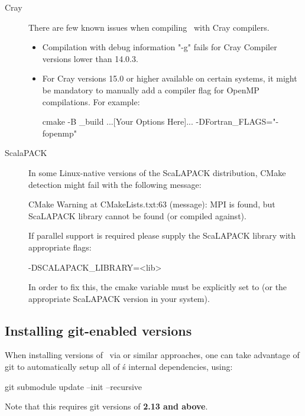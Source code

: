 \begin{description}
  \item[Cray]%
  There are few known issues when compiling \siesta\ with Cray compilers.

  \begin{itemize}
    \item Compilation with debug information "-g" fails for Cray Compiler
          versions lower than 14.0.3.

    \item For Cray versions 15.0 or higher available on certain systems,
    it might be mandatory to manually add a compiler flag for OpenMP
    compilations. For example:

      \begin{shellexample}
        cmake -B _build ...[Your Options Here]... -DFortran_FLAGS="-fopenmp"
      \end{shellexample}
  \end{itemize}

  \item[ScalaPACK]
  In some Linux-native versions of the ScaLAPACK distribution, CMake detection
  might fail with the following message:

  \begin{shellexample}[xleftmargin=1ex,fontsize=\footnotesize]
    CMake Warning at CMakeLists.txt:63 (message):
    MPI is found, but ScaLAPACK library cannot be found (or compiled against).

    If parallel support is required please supply the ScaLAPACK library with
    appropriate flags:

    -DSCALAPACK_LIBRARY=<lib>
  \end{shellexample}

  In order to fix this, the cmake variable  must be
  explicitly set to  (or the
  appropriate ScaLAPACK version in your system).
\end{description}


\subsection{Installing git-enabled versions}
When installing versions of \siesta\ via  or similar approaches,
one can take advantage of git to automatically setup all of \siesta\'s internal
dependencies, using:

\begin{shellexample}[xleftmargin=1ex,fontsize=\footnotesize]
  git submodule update --init --recursive
\end{shellexample}

\note Note that this requires git versions of \textbf{2.13 and above}.
